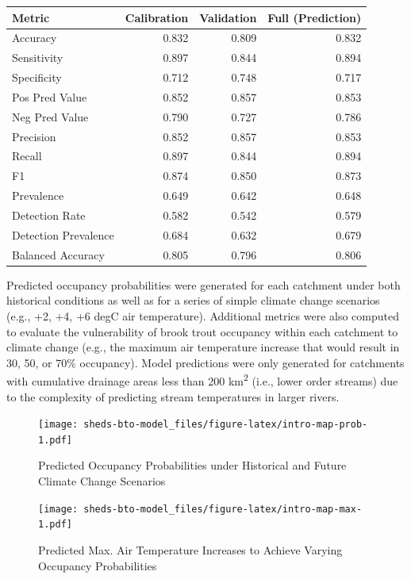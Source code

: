 \documentclass[
]{book}
\begin{document}
\begin{tabular}{l|r|r|r}
\hline
Metric & Calibration & Validation & Full (Prediction)\\
\hline
Accuracy & 0.832 & 0.809 & 0.832\\
\hline
Sensitivity & 0.897 & 0.844 & 0.894\\
\hline
Specificity & 0.712 & 0.748 & 0.717\\
\hline
Pos Pred Value & 0.852 & 0.857 & 0.853\\
\hline
Neg Pred Value & 0.790 & 0.727 & 0.786\\
\hline
Precision & 0.852 & 0.857 & 0.853\\
\hline
Recall & 0.897 & 0.844 & 0.894\\
\hline
F1 & 0.874 & 0.850 & 0.873\\
\hline
Prevalence & 0.649 & 0.642 & 0.648\\
\hline
Detection Rate & 0.582 & 0.542 & 0.579\\
\hline
Detection Prevalence & 0.684 & 0.632 & 0.679\\
\hline
Balanced Accuracy & 0.805 & 0.796 & 0.806\\
\hline
\end{tabular}

Predicted occupancy probabilities were generated for each catchment under both historical conditions as well as for a series of simple climate change scenarios (e.g., +2, +4, +6 degC air temperature). Additional metrics were also computed to evaluate the vulnerability of brook trout occupancy within each catchment to climate change (e.g., the maximum air temperature increase that would result in 30, 50, or 70\% occupancy). Model predictions were only generated for catchments with cumulative drainage areas less than 200 km\textsuperscript{2} (i.e., lower order streams) due to the complexity of predicting stream temperatures in larger rivers.

\begin{figure}
\centering
\texttt{[image: sheds-bto-model\_files/figure-latex/intro-map-prob-1.pdf]}
\caption{\label{fig:intro-map-prob}Predicted Occupancy Probabilities under Historical and Future Climate Change Scenarios}
\end{figure}

\begin{figure}
\centering
\texttt{[image: sheds-bto-model\_files/figure-latex/intro-map-max-1.pdf]}
\caption{\label{fig:intro-map-max}Predicted Max. Air Temperature Increases to Achieve Varying Occupancy Probabilities}
\end{figure}
\end{document}
